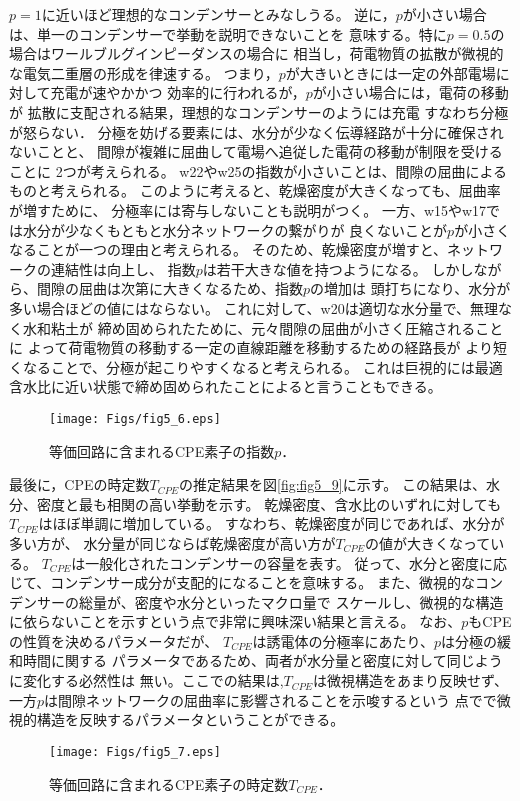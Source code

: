 $p=1$に近いほど理想的なコンデンサーとみなしうる。
逆に，$p$が小さい場合は、単一のコンデンサーで挙動を説明できないことを
意味する。特に$p=0.5$の場合はワールブルグインピーダンスの場合に
相当し，荷電物質の拡散が微視的な電気二重層の形成を律速する。
つまり，$p$が大きいときには一定の外部電場に対して充電が速やかかつ
効率的に行われるが，$p$が小さい場合には，電荷の移動が
拡散に支配される結果，理想的なコンデンサーのようには充電
すなわち分極が怒らない．
分極を妨げる要素には、水分が少なく伝導経路が十分に確保されないことと、
間隙が複雑に屈曲して電場へ追従した電荷の移動が制限を受けることに
2つが考えられる。
w22やw25の指数が小さいことは、間隙の屈曲によるものと考えられる。
このように考えると、乾燥密度が大きくなっても、屈曲率が増すために、
分極率には寄与しないことも説明がつく。
一方、w15やw17では水分が少なくもともと水分ネットワークの繋がりが
良くないことが$p$が小さくなることが一つの理由と考えられる。
そのため、乾燥密度が増すと、ネットワークの連結性は向上し、
指数$p$は若干大きな値を持つようになる。
しかしながら、間隙の屈曲は次第に大きくなるため、指数$p$の増加は
頭打ちになり、水分が多い場合ほどの値にはならない。
これに対して、w20は適切な水分量で、無理なく水和粘土が
締め固められたために、元々間隙の屈曲が小さく圧縮されることに
よって荷電物質の移動する一定の直線距離を移動するための経路長が
より短くなることで、分極が起こりやすくなると考えられる。
これは巨視的には最適含水比に近い状態で締め固められたことによると言うこともできる。
\begin{figure}[h]
	\begin{center}
	\texttt{[image: Figs/fig5\_6.eps]} 
	\end{center}
	\caption{
		等価回路に含まれるCPE素子の指数$p$．
	} 
	\label{fig:fig5_6}
\end{figure}
最後に，CPEの時定数$T_{CPE}$の推定結果を図\ref{fig:fig5_9}に示す。
この結果は、水分、密度と最も相関の高い挙動を示す。
乾燥密度、含水比のいずれに対しても$T_{CPE}$はほぼ単調に増加している。
すなわち、乾燥密度が同じであれば、水分が多い方が、
水分量が同じならば乾燥密度が高い方が$T_{CPE}$の値が大きくなっている。
$T_{CPE}$は一般化されたコンデンサーの容量を表す。
従って、水分と密度に応じて、コンデンサー成分が支配的になることを意味する。
また、微視的なコンデンサーの総量が、密度や水分といったマクロ量で
スケールし、微視的な構造に依らないことを示すという点で非常に興味深い結果と言える。
なお、$p$もCPEの性質を決めるパラメータだが、
$T_{CPE}$は誘電体の分極率にあたり、$p$は分極の緩和時間に関する
パラメータであるため、両者が水分量と密度に対して同じように変化する必然性は
無い。ここでの結果は,$T_{CPE}$は微視構造をあまり反映せず、
一方$p$は間隙ネットワークの屈曲率に影響されることを示唆するという
点でで微視的構造を反映するパラメータということができる。
\begin{figure}[h]
	\begin{center}
	\texttt{[image: Figs/fig5\_7.eps]} 
	\end{center}
	\caption{
		等価回路に含まれるCPE素子の時定数$T_{CPE}$．
	} 
	\label{fig:fig5_7}
\end{figure}
